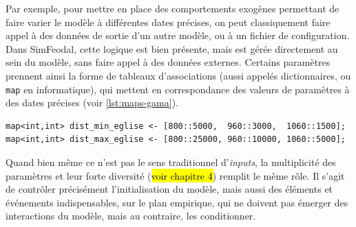 Par exemple, pour mettre en place des comportements exogènes permettant de faire varier le modèle à différentes dates précises, on peut classiquement faire appel à des données de sortie d'un autre modèle, ou à un fichier de configuration.
Dans SimFeodal, cette logique est bien présente, mais est gérée directement au sein du modèle, sans faire appel à des données externes.
Certains paramètres prennent ainsi la forme de tableaux d'associations (aussi appelés dictionnaires, ou \og \texttt{map}\fg{} en informatique), qui mettent en correspondance des valeurs de paramètres à des dates précises (voir \cref{lst:maps-gama}).
\medskip

{\footnotesize
	\begin{lstlisting}[caption={
	Deux exemples de \texttt{map} dans Gama.
	\textit{À partir de 800, les églises doivent se situer entre 5 et 25~km, puis entre 3 et 10~km de 960 à 1060, et entre 1.5 et 5~km après cette date.}}, captionpos=b, label={lst:maps-gama}]
map<int,int> dist_min_eglise <- [800::5000,  960::3000,  1060::1500];
map<int,int> dist_max_eglise <- [800::25000, 960::10000, 1060::5000]; 
	\end{lstlisting}
}



Quand bien même ce n'est pas le sens traditionnel d'\textit{inputs}, la multiplicité des paramètres et leur forte diversité (\hl{voir chapitre 4}) remplit le même rôle.
Il s'agit de contrôler précisément l'initialisation du modèle, mais aussi des éléments et événements indispensables, sur le plan empirique, qui ne doivent pas émerger des interactions du modèle, mais au contraire, les conditionner.


